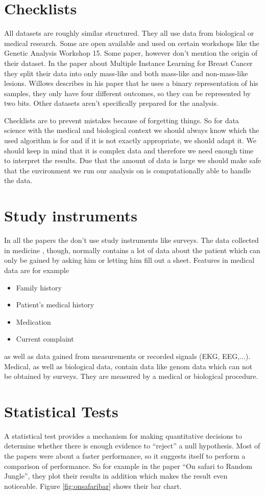 \documentclass{sig-alternate-05-2015}
\begin{document}
\section{Checklists}
All datasets are roughly similar structured. They all use data from biological or medical research. Some are open available and used on certain workshops like the Genetic Analysis Workshop 15. Some paper, however don't mention the origin of their dataset. In the paper about Multiple Instance Learning for Breast Cancer they split their data into only mass-like and both mass-like and non-mass-like lesions. Willows describes in his paper that he uses a binary representation of his samples, they only have four different outcomes, so they can be represented by two bits. Other datasets aren't specifically prepared for the analysis.

Checklists are to prevent mistakes because of forgetting things. So for data science with the medical and biological context we should always know which the used algorithm is for and if it is not exactly appropriate, we should adapt it. We should keep in mind that it is complex data and therefore we need enough time to interpret the results. Due that the amount of data is large we should make safe that the environment we run our analysis on is computationally able to handle the data.

\section{Study instruments}
In all the papers the don't use study instruments like surveys. The data collected in medicine \cite{nmd2004szolo}, though, normally contains a lot of data about the patient which can only be gained by asking him or letting him fill out a sheet. Features in medical data are for example
\begin{itemize}
\item Family history
\item Patient's medical history
\item Medication
\item Current complaint
\end{itemize}
as well as data gained from measurements or recorded signals (EKG, EEG,...). Medical, as well as biological data, contain data like genom data which can not be obtained by surveys. They are measured by a medical or biological procedure.

\section{Statistical Tests}
A statistical test provides a mechanism for making quantitative decisions to determine whether there is enough evidence to ``reject'' a null hypothesis. Most of the papers were about a faster performance, so it suggests itself to perform a comparison of performance.
So for example in the paper ``On safari to Random Jungle'', they plot their results in addition which makes the result even noticeable. Figure \ref{fig:onsafaribar} shows their bar chart.
\end{document}
